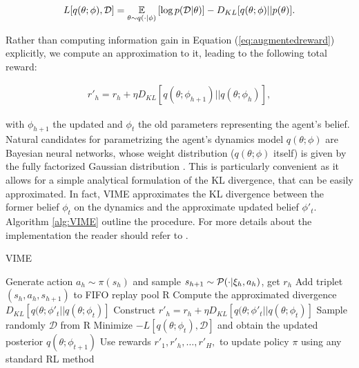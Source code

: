 \begin{align}
L[q(\theta;\phi),\mathcal{D}] = \underset{\theta\sim q(\cdot|\phi)}{\mathbb{E}}\left[{\log p(\mathcal{D}|\theta)}\right]-D_{KL}[q(\theta;\phi)||p(\theta)]. \label{eq:elb}
\end{align}

Rather than computing information gain in Equation (\ref{eq:augmentedreward}) explicitly, we compute an approximation to it, leading to the following total reward:

\begin{align}
r'_h = r_h + \eta D_{KL}[q(\theta;\phi_{h+1})||q(\theta;\phi_h)],
\end{align}

with $\phi_{h+1}$ the updated and $\phi_{t}$ the old parameters representing the agent’s belief. Natural candidates for parametrizing the agent’s dynamics model $q(\theta;\phi)$ are Bayesian neural networks, whose weight distribution ($q(\theta;\phi)$ itself) is given by the fully factorized Gaussian distribution \cite{blundell2015weight}. This is particularly convenient as it allows for a simple analytical formulation of the KL divergence, that can be easily approximated. In fact, \gls{VIME} approximates the KL divergence between the former belief $\phi_{t}$ on the dynamics and the approximate updated belief $\phi'_{t}$. Algorithm \ref{alg:VIME} outline the procedure. For more details about the implementation the reader should refer to \cite{houthooft2016vime}. 

\begin{algorithm}[t]
	\caption{\gls{VIME}}
	\label{alg:VIME}
	\begin{algorithmic}[1]
			\State Generate action $a_h\sim\pi(s_h)$ and sample $s_{h+1}\sim\mathcal{P}(\cdot|\xi_h,a_h)$, get $r_h$
			\State Add triplet $(s_h,a_h,s_{h+1})$ to FIFO replay pool R
			\State Compute the approximated divergence $D_{KL}[q(\theta;\phi'_{t}||q(\theta;\phi_{t})]$
			\State Construct $r'_h = r_h + \eta D_{KL}[q(\theta;\phi'_{t}||q(\theta;\phi_{t})]$
		\EndFor
		\State Sample randomly $\mathcal{D}$ from R
		\State Minimize $-L[q(\theta;\phi_t),\mathcal{D}]$ and obtain the updated posterior $q(\theta;\phi_{t+1})$
		\State Use rewards ${r'_1,r'_h,\dots,r'_H,}$ to update policy $\pi$ using any standard \gls{RL} method
	\EndFor
	\end{algorithmic}
\end{algorithm}

